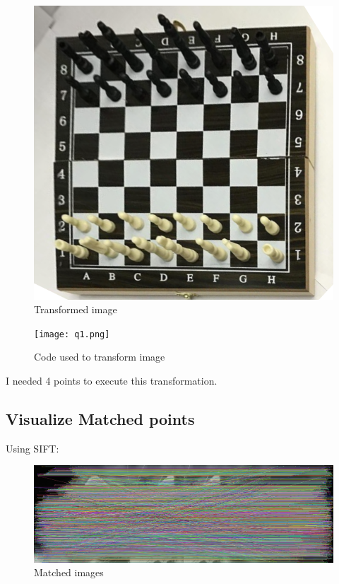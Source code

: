 \documentclass[12pt, letterpaper]{article}
\begin{document}
\begin{figure}[H]
    \centering
    \includegraphics[width=\textwidth]{new_chess.png}
    \caption{Transformed image}
\end{figure}

\begin{figure}[H]
    \centering
    \texttt{[image: q1.png]}
    \caption{Code used to transform image}
\end{figure}

I needed 4 points to execute this transformation.

\subsection{Visualize Matched points}

Using SIFT:

\begin{figure}[H]
    \centering
    \includegraphics[width=\textwidth]{image_1_matches.png}
    \caption{Matched images}
\end{figure}
\end{document}
